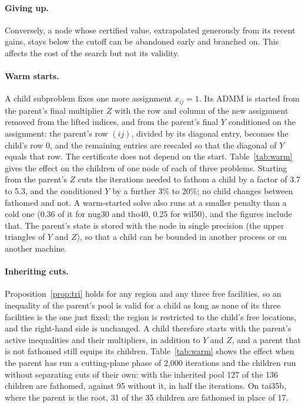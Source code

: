 \documentclass[11pt]{article}
\theoremstyle{remark}
\begin{document}
\paragraph{Giving up.} Conversely, a node whose certified value, extrapolated
generously from its recent gains, stays below the cutoff can be abandoned early
and branched on. This affects the cost of the search but not its validity.

\paragraph{Warm starts.} A child subproblem fixes one more assignment
$x_{ij} = 1$. Its ADMM is started from the parent's final multiplier $Z$ with the
row and column of the new assignment removed from the lifted indices, and from
the parent's final $Y$ conditioned on the assignment: the parent's row $(ij)$,
divided by its diagonal entry, becomes the child's row 0, and the remaining
entries are rescaled so that the diagonal of $Y$ equals that row. The certificate
does not depend on the start. Table~\ref{tab:warm} gives the effect on the children of one node of each of
three problems. Starting from the parent's $Z$ cuts the iterations needed to
fathom a child by a factor of 3.7 to 5.3, and the conditioned $Y$ by a further
3\% to 20\%; no child changes between fathomed and not. A warm-started solve
also runs at a smaller penalty than a cold one (0.36 of it for nug30 and tho40,
0.25 for wil50), and the figures include that.
The parent's state is stored with the
node in single precision (the upper triangles of $Y$ and $Z$), so that a child
can be bounded in another process or on another machine.

\paragraph{Inheriting cuts.} Proposition~\ref{prop:tri} holds for any region and
any three free facilities, so an inequality of the parent's pool is valid for a
child as long as none of its three facilities is the one just fixed; the region is
restricted to the child's free locations, and the right-hand side is unchanged.
A child therefore starts with the parent's active inequalities and their
multipliers, in addition to $Y$ and $Z$, and a parent that is not fathomed still
equips its children. Table~\ref{tab:warm} shows the effect when the parent has run a cutting-plane
phase of 2,000 iterations and the children run without separating cuts of their
own: with the inherited pool 127 of the 136 children are fathomed, against 95
without it, in half the iterations. On tai35b, where the parent is the root, 31
of the 35 children are fathomed in place of 17.
\end{document}

